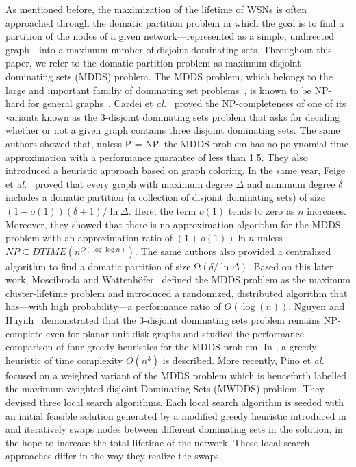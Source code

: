 \documentclass[algorithms,article,accept,moreauthors,pdftex]{Definitions/mdpi}
\begin{document}
As mentioned before, the maximization of the lifetime of WSNs is often approached through the domatic partition problem in which the goal is to find a partition of the nodes of a given network---represented as a simple, undirected graph---into a maximum number of disjoint dominating sets. Throughout this paper, we refer to the domatic partition problem as maximum disjoint dominating sets (MDDS) problem. The MDDS problem, which belongs to the large and important familiy of dominating set problems~\cite{a13120339,li2019multi,a14030079}, is known to be NP-hard for general graphs~\cite{Garey79:DDScomplexity}. Cardei et \textit{al.}~\cite{cardei2002:DDSproblem} proved the NP-completeness of one of its variants known as the 3-disjoint dominating sets problem that asks for deciding whether or not a given graph contains three disjoint dominating sets. The same authors showed that, unless P = NP, the MDDS problem has no polynomial-time approximation with a performance guarantee of less than 1.5. They also introduced a heuristic approach based on graph coloring. In the same year, Feige et \textit{al.}~\cite{feige2002approximating} proved that every graph with maximum degree $\Delta$ and minimum degree $\delta$ includes a domatic partition (a collection of disjoint dominating sets) of size $(1-o(1)) (\delta+1)/\ln \Delta$. Here, the term $o(1)$ tends to zero as $n$ increases. Moreover, they showed that there is no approximation algorithm for the MDDS problem with an approximation ratio of $(1 + o(1)) \ln n$  unless $ NP \subseteq DTIME(n^{O(\log \log n)})$. The same authors also provided a centralized algorithm to find a domatic partition of size $Ω(\delta/ \ln \Delta)$. Based on this later work, Moscibroda and Wattenh{\"o}fer~\cite{moscibroda2005:DDSproblem} defined the MDDS problem  as the maximum cluster-lifetime problem  and introduced a randomized, distributed algorithm that has---with high probability---a performance ratio of $O(\log(n))$. Nguyen and Huynh~\cite{nguyen2007:greedy_planar} demonstrated that the 3-disjoint dominating sets problem remains NP-complete even for planar unit disk graphs and studied the performance comparison of four greedy heuristics for the MDDS problem. In \cite{islam2009:DDS_greedy}, a greedy heuristic of time complexity $O(n^{3})$ is described. More recently, Pino et \textit{al.} \cite{pino2018:dominating} focused on a weighted variant of the MDDS problem which is henceforth labelled the maximum weighted disjoint Dominating Sets (MWDDS) problem. They devised three local search algorithms. Each local search algorithm is seeded with an initial feasible solution generated by a modified greedy heuristic introduced in \cite{islam2009:DDS_greedy} and iteratively swaps nodes between different dominating sets in the solution, in the hope to increase the total lifetime of the network. These local search approaches differ in the way they realize the swaps. \\
\end{document}
